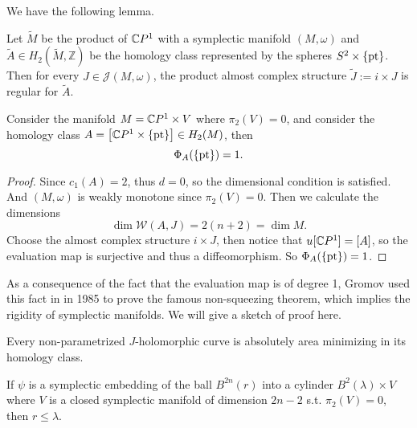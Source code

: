 \documentclass[twoside]{article}
\begin{document}
We have the following lemma.

\begin{lemma}
    Let $\widetilde{M}$ be the product of $\mathbb{C}P^{1}$ with a symplectic manifold 
    $(M,\omega)$ and $\widetilde{A}\in H_2(\widetilde{M},\mathbb{Z})$ 
    be the homology class represented by the spheres $S^2\times\{\operatorname{pt}\}  $. 
    Then for every $J\in\mathscr{J}(M,\omega)$, 
    the product almost complex structure $\widetilde{J}:=i\times J$ is regular for $\widetilde{A}$.
\end{lemma}

\begin{example}
    Consider the manifold $M=\mathbb{C}P^{1}\times V$ where $\pi_2(V)=0$, 
    and consider the homology class $A=\left[\mathbb{C}P^{1}\times \{\operatorname{pt}\}\right]\in H_2(M)$, then
    \[\Phi_{A}(\{\operatorname{pt}\})=1.\]
\end{example}

\begin{proof}
    Since $c_1(A)=2$, thus $d=0$, so the dimensional condition is satisfied.  
    And $(M,\omega)$ is weakly monotone since $\pi_2(V)=0$. 
    Then we calculate the dimensions
    \[\dim\mathscr{W}(A,J)=2(n+2)=\dim M.\]
    Choose the almost complex structure $i\times J$, then notice that $u[\mathbb{C}P^{1}]=[A]$, 
    so the evaluation map is surjective and thus a diffeomorphism. So $\Phi_{A}(\{\operatorname{pt}\})=1$.
\end{proof} 

As a consequence of the fact that the evaluation map is of degree 1, 
Gromov used this fact in \cite{gromov} in 1985 to prove the famous non-squeezing theorem, 
which implies the rigidity of symplectic manifolds. We will give a sketch of proof here. 

\begin{lemma}
    Every non-parametrized $J$-holomorphic curve is absolutely area minimizing in its homology class.
\end{lemma}

\begin{theorem}
    If $\psi$ is a symplectic embedding of the ball $B^{2n}(r)$ 
    into a cylinder $B^2(\lambda)\times V$ where $V$ is a closed 
    symplectic manifold of dimension $2n-2$ s.t. $\pi_2(V)=0$, then $r\leq \lambda$.
\end{theorem}
\end{document}
